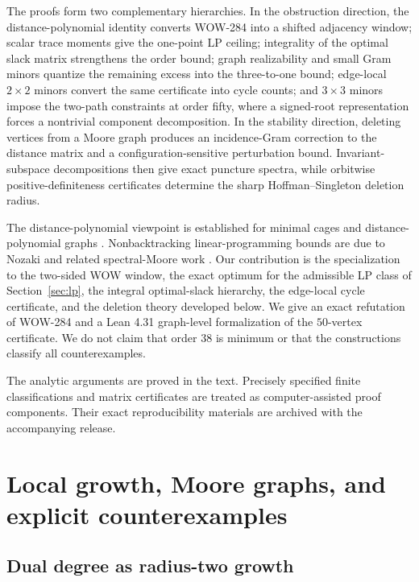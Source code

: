 \documentclass[a4paper,10pt,reqno]{amsart}
\theoremstyle{plain}
\theoremstyle{definition}
\theoremstyle{remark}
\begin{document}
The proofs form two complementary hierarchies.  In the obstruction direction,
the distance-polynomial identity converts WOW-284 into a shifted adjacency
window; scalar trace moments give the one-point LP ceiling; integrality of the
optimal slack matrix strengthens the order bound; graph realizability and
 small Gram minors quantize the remaining excess into the three-to-one bound;
edge-local \(2\times2\) minors convert the same certificate into cycle counts;
and \(3\times3\) minors impose the two-path constraints at order fifty, where
a signed-root representation forces a nontrivial component decomposition.
In the stability
direction, deleting vertices from a Moore graph produces an incidence-Gram
correction to the distance matrix and a configuration-sensitive perturbation
bound.
Invariant-subspace decompositions then give exact puncture spectra, while
orbitwise positive-definiteness certificates determine the sharp
Hoffman--Singleton deletion radius.

The distance-polynomial viewpoint is established for minimal cages and
distance-polynomial graphs
\cite{HowladerPanigrahi2022,Fiol2016}.  Nonbacktracking linear-programming
bounds are due to Nozaki and related spectral-Moore work
\cite{Nozaki2015,CioabaEtAl2016}.  Our contribution is the specialization to
the two-sided WOW window, the exact optimum for the admissible LP class of
Section~\ref{sec:lp}, the integral optimal-slack hierarchy, the edge-local
cycle certificate, and the deletion theory developed below.  We give an exact
refutation of WOW-284 and a Lean 4.31 graph-level formalization of the
\(50\)-vertex certificate.  We do not claim that order \(38\) is minimum or
that the constructions classify all counterexamples.

The analytic arguments are proved in the text.  Precisely specified finite
classifications and matrix certificates are treated as computer-assisted proof
components.  Their exact reproducibility materials are archived with the
accompanying release.

\section{Local growth, Moore graphs, and explicit counterexamples}
\label{sec:examples}

\subsection{Dual degree as radius-two growth}
\end{document}
